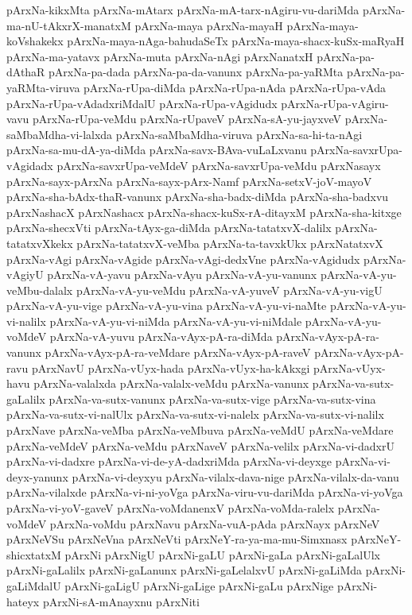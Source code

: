 {pArxNa-kikxMta
pArxNa-mAtarx
pArxNa-mA-tarx-nAgiru-vu-dariMda
pArxNa-ma-nU-tAkxrX-manatxM
pArxNa-maya
pArxNa-mayaH
pArxNa-maya-koVshakekx
pArxNa-maya-nAga-bahudaSeTx
pArxNa-maya-shacx-kuSx-maRyaH
pArxNa-ma-yatavx
pArxNa-muta
pArxNa-nAgi
pArxNanatxH
pArxNa-pa-dAthaR
pArxNa-pa-dada
pArxNa-pa-da-vanunx
pArxNa-pa-yaRMta
pArxNa-pa-yaRMta-viruva
pArxNa-rUpa-diMda
pArxNa-rUpa-nAda
pArxNa-rUpa-vAda
pArxNa-rUpa-vAdadxriMdalU
pArxNa-rUpa-vAgidudx
pArxNa-rUpa-vAgiru-vavu
pArxNa-rUpa-veMdu
pArxNa-rUpaveV
pArxNa-sA-yu-jayxveV
pArxNa-saMbaMdha-vi-lalxda
pArxNa-saMbaMdha-viruva
pArxNa-sa-hi-ta-nAgi
pArxNa-sa-mu-dA-ya-diMda
pArxNa-savx-BAva-vuLaLxvanu
pArxNa-savxrUpa-vAgidadx
pArxNa-savxrUpa-veMdeV
pArxNa-savxrUpa-veMdu
pArxNasayx
pArxNa-sayx-pArxNa
pArxNa-sayx-pArx-Namf
pArxNa-setxV-joV-mayoV
pArxNa-sha-bAdx-thaR-vanunx
pArxNa-sha-badx-diMda
pArxNa-sha-badxvu
pArxNashacX
pArxNashacx
pArxNa-shacx-kuSx-rA-ditayxM
pArxNa-sha-kitxge
pArxNa-shecxVti
pArxNa-tAyx-ga-diMda
pArxNa-tatatxvX-dalilx
pArxNa-tatatxvXkekx
pArxNa-tatatxvX-veMba
pArxNa-ta-tavxkUkx
pArxNatatxvX
pArxNa-vAgi
pArxNa-vAgide
pArxNa-vAgi-dedxVne
pArxNa-vAgidudx
pArxNa-vAgiyU
pArxNa-vA-yavu
pArxNa-vAyu
pArxNa-vA-yu-vanunx
pArxNa-vA-yu-veMbu-dalalx
pArxNa-vA-yu-veMdu
pArxNa-vA-yuveV
pArxNa-vA-yu-vigU
pArxNa-vA-yu-vige
pArxNa-vA-yu-vina
pArxNa-vA-yu-vi-naMte
pArxNa-vA-yu-vi-nalilx
pArxNa-vA-yu-vi-niMda
pArxNa-vA-yu-vi-niMdale
pArxNa-vA-yu-voMdeV
pArxNa-vA-yuvu
pArxNa-vAyx-pA-ra-diMda
pArxNa-vAyx-pA-ra-vanunx
pArxNa-vAyx-pA-ra-veMdare
pArxNa-vAyx-pA-raveV
pArxNa-vAyx-pA-ravu
pArxNavU
pArxNa-vUyx-hada
pArxNa-vUyx-ha-kAkxgi
pArxNa-vUyx-havu
pArxNa-valalxda
pArxNa-valalx-veMdu
pArxNa-vanunx
pArxNa-va-sutx-gaLalilx
pArxNa-va-sutx-vanunx
pArxNa-va-sutx-vige
pArxNa-va-sutx-vina
pArxNa-va-sutx-vi-nalUlx
pArxNa-va-sutx-vi-nalelx
pArxNa-va-sutx-vi-nalilx
pArxNave
pArxNa-veMba
pArxNa-veMbuva
pArxNa-veMdU
pArxNa-veMdare
pArxNa-veMdeV
pArxNa-veMdu
pArxNaveV
pArxNa-velilx
pArxNa-vi-dadxrU
pArxNa-vi-dadxre
pArxNa-vi-de-yA-dadxriMda
pArxNa-vi-deyxge
pArxNa-vi-deyx-yanunx
pArxNa-vi-deyxyu
pArxNa-vilalx-dava-nige
pArxNa-vilalx-da-vanu
pArxNa-vilalxde
pArxNa-vi-ni-yoVga
pArxNa-viru-vu-dariMda
pArxNa-vi-yoVga
pArxNa-vi-yoV-gaveV
pArxNa-voMdanenxV
pArxNa-voMda-ralelx
pArxNa-voMdeV
pArxNa-voMdu
pArxNavu
pArxNa-vuA-pAda
pArxNayx
pArxNeV
pArxNeVSu
pArxNeVna
pArxNeVti
pArxNeY-ra-ya-ma-mu-Simxnasx
pArxNeY-shicxtatxM
pArxNi
pArxNigU
pArxNi-gaLU
pArxNi-gaLa
pArxNi-gaLalUlx
pArxNi-gaLalilx
pArxNi-gaLanunx
pArxNi-gaLelalxvU
pArxNi-gaLiMda
pArxNi-gaLiMdalU
pArxNi-gaLigU
pArxNi-gaLige
pArxNi-gaLu
pArxNige
pArxNi-hateyx
pArxNi-sA-mAnayxnu
pArxNiti
}
